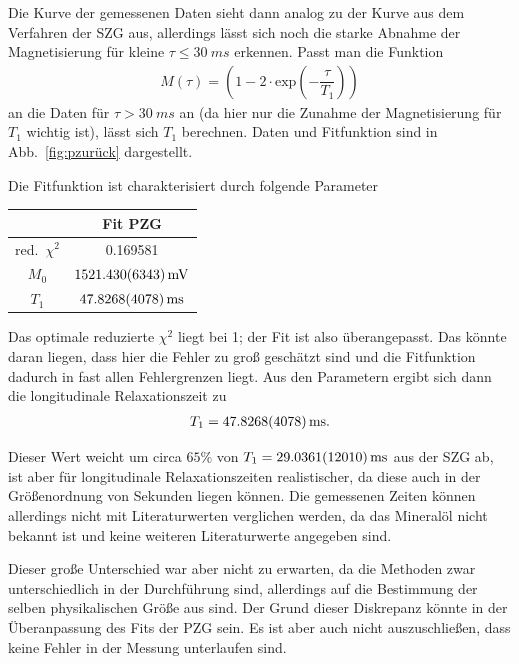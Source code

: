 \documentclass[10pt]{article}
\newenvironment{Figure}
  {\par\medskip\noindent\minipage{\linewidth}}
  {\endminipage\par\medskip}
\begin{document}
\begin{multicols}{2}
Die Kurve der gemessenen Daten sieht dann analog zu der Kurve aus dem Verfahren der SZG aus, allerdings lässt sich noch die starke Abnahme der Magnetisierung für kleine $\tau \leq \SI{30}{ms}$ erkennen.
Passt man die Funktion
\begin{align} 
        M\left(\tau \right)=\left(1-2\cdot \text{exp}\left(-\dfrac{\tau }{T_1}\right)\right)
\end{align} 
an die Daten für $\tau >\SI{30}{ms}$ an (da hier nur die Zunahme der Magnetisierung für $T_1$ wichtig ist), lässt sich $T_1$ berechnen.
Daten und Fitfunktion sind in Abb.\ \ref{fig:pzurück} dargestellt.
  \begin{Figure}
    \centering\resizebox{\textwidth}{!}{}
    \label{fig:pzurück}
  \end{Figure}
Die Fitfunktion ist charakterisiert durch folgende Parameter
  \begin{center}
    \begin{tabular}{c|c}
    & Fit PZG\\
    \hline
    red.\ $\chi^2$ & 0.169581\\
    $M_0$ & $\SI{1521.43+-6.343}{mV}$ \\
    $T_1$ & $\SI{47.8268+-0.4078}{ms}$ 
    \end{tabular}
  \label{Tab:PZG_para}
  \end{center}
Das optimale reduzierte $\chi ^2$ liegt bei 1; der Fit ist also überangepasst.
Das könnte daran liegen, dass hier die Fehler zu groß geschätzt sind und die Fitfunktion dadurch in fast allen Fehlergrenzen liegt.
Aus den Parametern ergibt sich dann die longitudinale Relaxationszeit zu
\begin{align} 
        T_1=\SI{47.8268+-0.4078}{ms}
.\end{align} 

Dieser Wert weicht um circa $65\%$ von $T_1=\SI{29.0361+-1.201}{ms}$ aus der SZG ab, ist aber für longitudinale Relaxationszeiten realistischer, da diese auch in der Größenordnung von Sekunden liegen können.
Die gemessenen Zeiten können allerdings nicht mit Literaturwerten verglichen werden, da das Mineralöl nicht bekannt ist und keine weiteren Literaturwerte angegeben sind.

Dieser große Unterschied war aber nicht zu erwarten, da die Methoden zwar unterschiedlich in der Durchführung sind, allerdings auf die Bestimmung der selben physikalischen Größe aus sind.
Der Grund dieser Diskrepanz könnte in der Überanpassung des Fits der PZG sein.
Es ist aber auch nicht auszuschließen, dass keine Fehler in der Messung unterlaufen sind.


\end{multicols}
\end{document}

